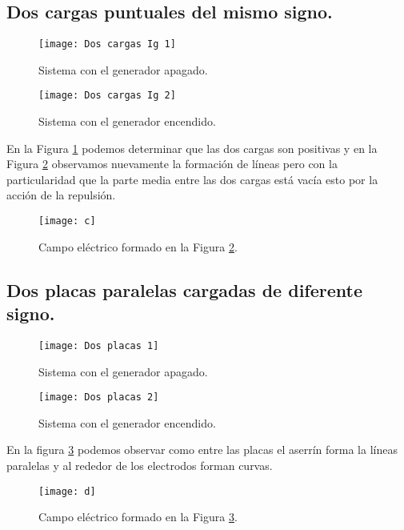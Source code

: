 \documentclass[spanish,10pt,a4paper,final,onecolumn,leqno,fleqn]{article}
\begin{document}
\newpage
\subsection{Dos cargas puntuales del mismo signo.}

\begin{figure}[h!]
	\centering
	\texttt{[image: Dos cargas Ig 1]}
	\caption{Sistema con el generador apagado.}
	\label{fig:2CarIA}
\end{figure}

\begin{figure}[h!]
	\centering
	\texttt{[image: Dos cargas Ig 2]}
	\caption{Sistema con el generador encendido.}
	\label{fig:2CarI}
\end{figure}

En la Figura \ref{fig:2CarIA} podemos determinar que las dos cargas son positivas y en la Figura \ref{fig:2CarI} observamos nuevamente la formación de líneas pero con la particularidad que la parte media entre las dos cargas está vacía esto por la acción de la repulsión.

\begin{figure}
	\centering
	\texttt{[image: c]}
	\caption{Campo eléctrico formado en la Figura \ref{fig:2CarI}.}
\end{figure}

\subsection{Dos placas paralelas cargadas de diferente signo.}

\begin{figure}[h!]
	\centering
	\texttt{[image: Dos placas 1]}
	\caption{Sistema con el generador apagado.}
\end{figure}

\begin{figure}[h!]
	\centering
	\texttt{[image: Dos placas 2]}
	\caption{Sistema con el generador encendido.}
	\label{fig:DosPlacas}
\end{figure}

En la figura \ref{fig:DosPlacas} podemos observar como entre las placas el aserrín forma la líneas paralelas y al rededor de los electrodos forman curvas.

\begin{figure}[h!]
	\centering
	\texttt{[image: d]}
	\caption{Campo eléctrico formado en la Figura \ref{fig:DosPlacas}.}
\end{figure}
\end{document}

